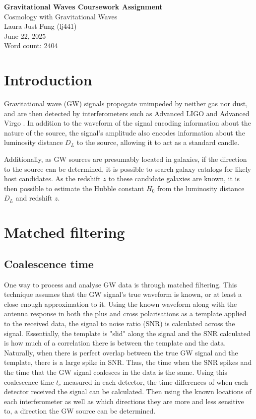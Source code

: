 \documentclass[11pt,a4paper]{article}
\begin{document}
 

\begin{center}
    \LARGE{\textbf{Gravitational Waves Coursework Assignment}}
    \\
    \Large{{Cosmology with Gravitational Waves}}
    \\
    \large{Laura Just Fung (lj441)}
    \\
    June 22, 2025
    \\
    Word count: 2404
\end{center}
\section{Introduction}
\label{sec:intro}
Gravitational wave (GW) signals propogate unimpeded by neither gas nor dust, and are then detected by interferometers such as Advanced LIGO \citep{LIGO2015} and Advanced Virgo \citep{Acernese_2014}. In addition to the waveform of the signal encoding information about the nature of the source, the signal's amplitude also encodes information about the luminosity distance $D_L$ to the source, allowing it to act as a standard candle.

Additionally, as GW sources are presumably located in galaxies, if the direction to the source can be determined, it is possible to search galaxy catalogs for likely host candidates. As the redshift $z$ to these candidate galaxies are known, it is then possible to estimate the Hubble constant $H_0$ from the luminosity distance $D_L$ and redshift $z$.

\section{Matched filtering}
\label{sec:matched_filtering}
\subsection{Coalescence time}
\label{sec:tc}
One way to process and analyse GW data is through matched filtering. This technique assumes that the GW signal's true waveform is known, or at least a close enough approximation to it. Using the known waveform along with the antenna response in both the plus and cross polarisations as a template applied to the received data, the signal to noise ratio (SNR) is calculated across the signal. Essentially, the template is "slid" along the signal and the SNR calculated is how much of a correlation there is between the template and the data. Naturally, when there is perfect overlap between the true GW signal and the template, there is a large spike in SNR. Thus, the time when the SNR spikes and the time that the GW signal coalesces in the data is the same. Using this coalescence time $t_c$ measured in each detector, the time differences of when each detector received the signal can be calculated. Then using the known locations of each interferometer as well as which directions they are more and less sensitive to, a direction the GW source can be determined. 
\end{document}
